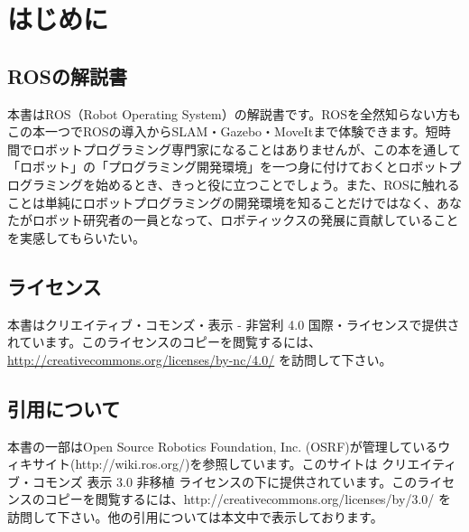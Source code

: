 \chapter*{はじめに}

\section*{ROSの解説書}

本書はROS（Robot Operating System）の解説書です。ROSを全然知らない方もこの本一つでROSの導入からSLAM・Gazebo・MoveItまで体験できます。短時間でロボットプログラミング専門家になることはありませんが、この本を通して「ロボット」の「プログラミング開発環境」を一つ身に付けておくとロボットプログラミングを始めるとき、きっと役に立つことでしょう。また、ROSに触れることは単純にロボットプログラミングの開発環境を知ることだけではなく、あなたがロボット研究者の一員となって、ロボティックスの発展に貢献していることを実感してもらいたい。

\section*{ライセンス}

本書はクリエイティブ・コモンズ・表示 - 非営利 4.0 国際・ライセンスで提供されています。このライセンスのコピーを閲覧するには、 \url{http://creativecommons.org/licenses/by-nc/4.0/} を訪問して下さい。

\section*{引用について}

本書の一部はOpen Source Robotics Foundation, Inc. (OSRF)が管理しているウィキサイト(http://wiki.ros.org/)を参照しています。このサイトは クリエイティブ・コモンズ 表示 3.0 非移植 ライセンスの下に提供されています。このライセンスのコピーを閲覧するには、http://creativecommons.org/licenses/by/3.0/ を訪問して下さい。他の引用については本文中で表示しております。

